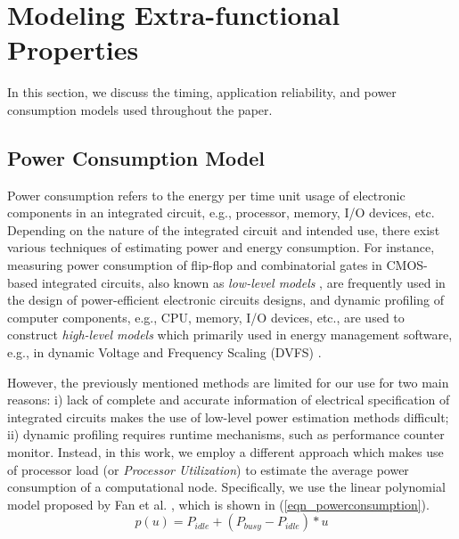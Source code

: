 \section{Modeling Extra-functional Properties}\label{sec_extrafunc}
In this section, we discuss the timing, application reliability, and power consumption models used throughout the paper.

\subsection{Power Consumption Model}
Power consumption refers to the energy per time unit usage of electronic components in an integrated circuit, e.g., processor, memory, I/O devices, etc. Depending on the nature of the integrated circuit and intended use, there exist various techniques of estimating power and energy consumption. For instance, measuring power consumption of flip-flop and combinatorial gates in CMOS-based integrated circuits, also known as \textit{low-level models }\cite{Najm1994ACircuits}\cite{Najm1995PowerCircuits}, are frequently used in the design of power-efficient electronic circuits designs,  and dynamic profiling of computer components, e.g., CPU, memory, I/O devices, etc., are used to construct \textit{high-level models} which primarily used in energy management software, e.g., in dynamic Voltage and Frequency Scaling (DVFS) \cite{Contreras2005PowerEvents}.

However, the previously mentioned methods are limited for our use for two main reasons: i) lack of complete and accurate information of electrical specification of integrated circuits makes the use of low-level power estimation methods difficult; ii) dynamic profiling requires runtime mechanisms, such as performance counter monitor. Instead, in this work, we employ a different approach which makes use of processor load (or \textit{Processor Utilization}) to estimate the average power consumption of a computational node. Specifically, we use the linear polynomial model proposed by Fan et al. \cite{Fan2007PowerComputer}, which is shown in (\ref{eqn_powerconsumption}). 
\begin{equation}
\label{eqn_powerconsumption}
p(u)=P_{idle} + (P_{busy}-P_{idle})*u
\end{equation}

